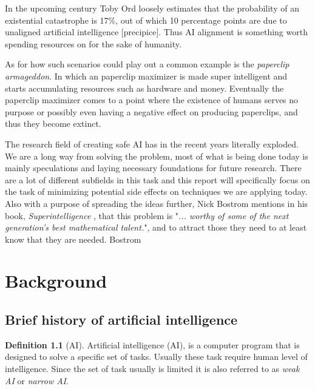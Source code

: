 \documentclass{report}
\newcommand{\autocite}{}
\theoremstyle{definition}
\newtheorem{definition}{Definition}[section]
\begin{document}
In the upcoming century Toby Ord loosely estimates that the probability of an existential catastrophe is 17\%, out of which 10 percentage points are due to unaligned artificial intelligence \autocite{[precipice]}. Thus AI alignment is something worth spending resources on for the sake of humanity. 

As for how such scenarios could play out a common example is the \textit{paperclip armageddon}. In which an paperclip maximizer is made super intelligent and starts accumulating resources such as hardware and money. Eventually the paperclip maximizer comes to a point where the existence of humans serves no purpose or possibly even having a negative effect on producing paperclips, and thus they become extinct.



The research field of creating safe AI has in the recent years literally exploded. We are a long way from solving the problem, most of what is being done today is mainly speculations and laying necessary foundations for future research. There are a lot of different subfields in this task and this report will specifically focus on the task of minimizing potential side effects on techniques we are applying today. Also with a purpose of spreading the ideas further, Nick Bostrom mentions in his book, \textit{Superintelligence} , that this problem is "\textit{... worthy of some of the next generation's best mathematical talent.}", and to attract those they need to at least know that they are needed. 
\autocite{Bostrom}






\chapter{Background}

\section{Brief history of artificial intelligence}
\begin{definition}[AI]
   Artificial intelligence (AI), is a computer program that is designed to solve a specific set of tasks. Usually these task require human level of intelligence. Since the set of task usually is limited it is also referred to as \textit{weak AI} or \textit{narrow AI}.
   \label{AI}
\end{definition}
\end{document}
